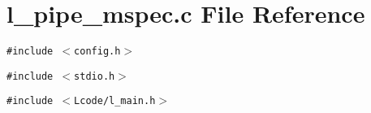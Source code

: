 \section{l\_\-pipe\_\-mspec.c File Reference}
\label{l__pipe__mspec_8c}
{\tt \#include $<$config.h$>$}\par
{\tt \#include $<$stdio.h$>$}\par
{\tt \#include $<$Lcode/l\_\-main.h$>$}\par
